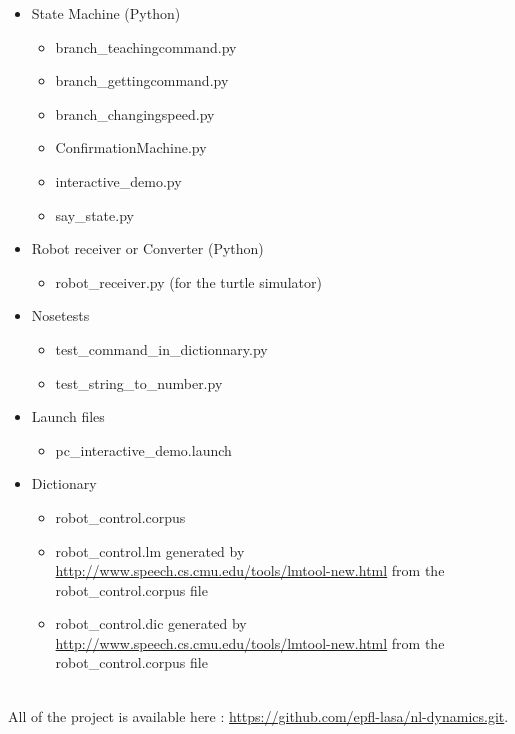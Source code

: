 \begin{itemize}
  \item State Machine (Python)
  	\begin{itemize}
  		\item branch\_teachingcommand.py
  		\item branch\_gettingcommand.py
  		\item branch\_changingspeed.py
  		\item ConfirmationMachine.py
  		\item interactive\_demo.py
  		\item say\_state.py 
  	\end{itemize}
  \item Robot receiver or Converter (Python)
  	\begin{itemize}
  		\item robot\_receiver.py (for the turtle simulator)
  	\end{itemize}
  \item Nosetests
  	\begin{itemize}
  		\item test\_command\_in\_dictionnary.py
  		\item test\_string\_to\_number.py 
  	\end{itemize}
  \item Launch files
  	\begin{itemize}
  		\item pc\_interactive\_demo.launch 
  	\end{itemize}
  \item Dictionary   
  	\begin{itemize}
  		\item robot\_control.corpus 
		\item robot\_control.lm \linebreak generated by \url{http://www.speech.cs.cmu.edu/tools/lmtool-new.html} from the robot\_control.corpus file
		\item robot\_control.dic \linebreak generated by \url{http://www.speech.cs.cmu.edu/tools/lmtool-new.html} from the robot\_control.corpus file
  	\end{itemize}

\end{itemize}
\hfill \\
All of the project is available here : \url{https://github.com/epfl-lasa/nl-dynamics.git}.


